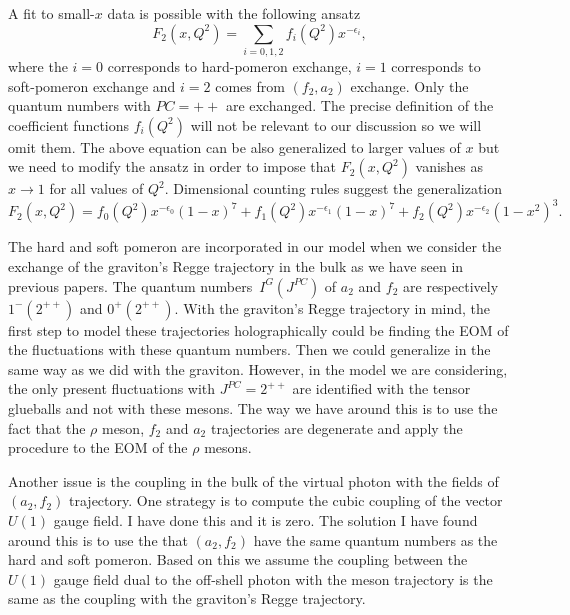 \documentclass[a4paper,12pt]{article}
\begin{document}
A fit to small-$x$ data is possible with the following ansatz
\begin{equation}
F_2 \left(x, Q^2\right) = \sum_{i = 0, 1, 2} f_i\left(Q^2\right) x^{- \epsilon_i},
\end{equation}
 where the $i=0$ corresponds to hard-pomeron exchange, $i=1$ corresponds to soft-pomeron exchange and $i = 2$ comes from $(f_2, a_2)$ exchange. Only the quantum numbers with $PC=++$ are exchanged.
 The precise definition of the coefficient functions $f_i\left(Q^2\right)$ will not be relevant to our discussion so we will omit them. The above equation can be also generalized to larger values of $x$ but we need to modify the ansatz in order to impose that $F_2\left(x, Q^2\right)$ vanishes as $x \rightarrow 1$ for all values of $Q^2$. Dimensional counting rules suggest the generalization
\begin{equation}
F_2\left(x, Q^2\right) = f_0 \left(Q^2\right) x^{-\epsilon_0} {\left(1-x\right)}^7 +  f_1 \left(Q^2\right) x^{-\epsilon_1} {\left(1-x\right)}^7 +  f_2 \left(Q^2\right) x^{-\epsilon_2} {\left(1-x^2\right)}^3.
\end{equation} 

The hard and soft pomeron are incorporated in our model when we consider the exchange of the graviton's Regge trajectory in the bulk as we have seen in previous papers. The quantum numbers~$I^G\left(J^{PC}\right)$ of $a_2$ and $f_2$ are respectively $1^{-} \left(2^{++}\right)$ and $0^{+}\left(2^{++}\right)$. With the graviton's Regge trajectory in mind, the first step to model these trajectories holographically could be finding the EOM of the fluctuations with these quantum numbers. Then we could generalize in the same way as we did with the graviton. However, in the model we are considering, the only present fluctuations with $J^{PC} = 2^{++}$ are identified with the tensor glueballs and not with these mesons. The way we have around this is to use the fact that the $\rho$ meson, $f_2$ and $a_2$ trajectories are degenerate and apply the procedure to the EOM of the $\rho$ mesons.

Another issue is the coupling in the bulk of the virtual photon with the fields of  $\left(a_2, f_2\right)$ trajectory. One strategy is to compute the cubic coupling of the vector $U\left(1\right)$ gauge field. I have done this and it is zero. The solution I have found around this is to use the that $\left(a_2, f_2\right)$ have the same quantum numbers as the hard and soft pomeron. Based on this we assume the coupling between the $U\left(1\right)$ gauge field dual to the off-shell photon with the meson trajectory is the same as the coupling with the graviton's Regge trajectory.
\end{document}
